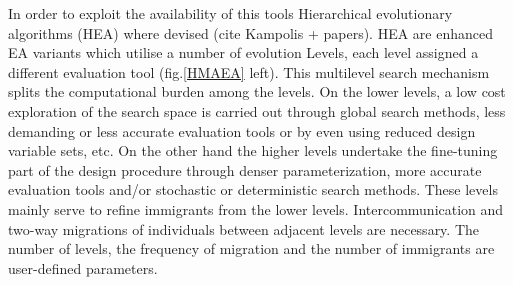 In order to exploit the availability of this tools Hierarchical evolutionary algorithms (HEA) where devised (cite Kampolis + papers). HEA are enhanced EA variants which utilise a number of evolution Levels, each level assigned a different evaluation tool (fig.\ref{HMAEA} left). This multilevel search mechanism splits the computational burden among the levels. On the lower levels, a low cost exploration of the search space is carried out through global search methods, less demanding or less accurate evaluation tools or by even using reduced design variable sets, etc. On the other hand the higher levels undertake the fine-tuning part of the design procedure through denser parameterization, more accurate evaluation tools and/or stochastic or deterministic search methods. These levels mainly serve to refine immigrants from the lower levels. Intercommunication and two-way migrations of individuals between adjacent levels are necessary. The number of levels, the frequency of migration and the number of immigrants are user-defined parameters.

